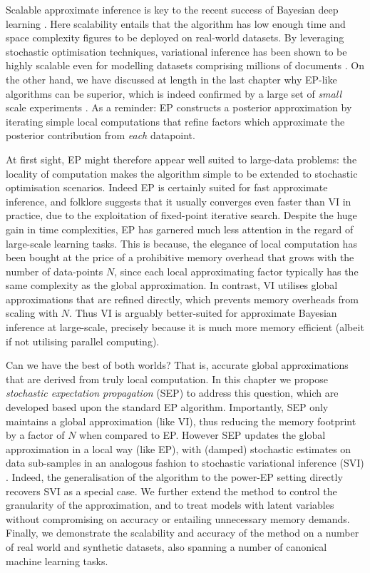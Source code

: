 Scalable approximate inference is key to the recent success of Bayesian deep learning \citep{hernandez-lobato:pbp2015, blundell:bnn2015, gal:dropout2016}. Here scalability entails that the algorithm has low enough time and space complexity figures to be deployed on real-world datasets. By leveraging stochastic optimisation techniques, variational inference \citep{jordan:vi1999,beal:vi2003, hoffman:svi2013} has been shown to be highly scalable even for modelling datasets comprising millions of documents \citep{broderick:stream2013}. On the other hand, we have discussed at length in the last chapter why EP-like algorithms can be superior, which is indeed confirmed by a large set of \emph{small} scale experiments \citep{kuss:gpep2005,barthelme:ep_likelihood2014,cunningham:gaussianEP2011}.
%
As a reminder: EP constructs a posterior approximation by iterating simple local computations that refine factors which approximate the posterior contribution from \emph{each} datapoint. 

At first sight, EP might therefore appear well suited to large-data problems: the locality of computation makes the algorithm simple to be extended to stochastic optimisation scenarios. Indeed EP is certainly suited for fast approximate inference, and folklore suggests that it usually converges even faster than VI in practice, due to the exploitation of fixed-point iterative search. 
%
Despite the huge gain in time complexities, EP has garnered much less attention in the regard of large-scale learning tasks. This is because, the elegance of local computation has been bought at the price of a prohibitive memory overhead that grows with the number of data-points $N$, since each local approximating factor typically has the same complexity as the global approximation. In contrast, VI utilises global approximations that are refined directly, which prevents memory overheads from scaling with $N$. Thus VI is arguably better-suited for approximate Bayesian inference at large-scale, precisely because it is much more memory efficient (albeit if not utilising parallel computing).

Can we have the best of both worlds? That is, accurate global approximations that are derived from truly local computation. In this chapter we propose \emph{stochastic expectation propagation} (SEP) to address this question, which are developed based upon the standard EP algorithm. Importantly, SEP only maintains a global approximation (like VI), thus reducing the memory footprint by a factor of $N$ when compared to EP. However SEP updates the global approximation in a local way (like EP), with (damped) stochastic estimates on data sub-samples in an analogous fashion to stochastic variational inference (SVI) \citep{hoffman:svi2013}. Indeed, the generalisation of the algorithm to the power-EP setting directly recovers SVI as a special case. 
%
We further extend the method to control the granularity of the approximation, and to treat models with latent variables without compromising on accuracy or entailing unnecessary memory demands. Finally, we demonstrate the scalability and accuracy of the method on a number of real world and synthetic datasets, also spanning a number of canonical machine learning tasks.


